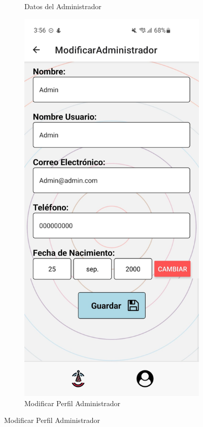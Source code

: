 \begin{figure}[H]
\begin{subfigure}{0.45\textwidth}
        \caption{Datos del Administrador}
        \label{fig:img5}
    \end{subfigure}%
    \hfill
    \begin{subfigure}{0.45\textwidth}
        \centering
        \includegraphics[width=\linewidth]{imagenes/Capturas/ModificarAdministrador.jpeg}
        \caption{Modificar Perfil Administrador}
        \label{fig:img6}
    \end{subfigure}
\end{figure}
\vspace*{\fill}

